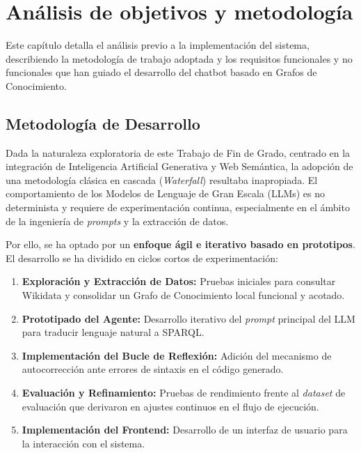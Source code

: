
\chapter{Análisis de objetivos y metodología}
\label{cap:analisis}

Este capítulo detalla el análisis previo a la implementación del sistema, describiendo la metodología de trabajo adoptada y los requisitos funcionales y no funcionales que han guiado el desarrollo del chatbot basado en Grafos de Conocimiento.

\section{Metodología de Desarrollo}

Dada la naturaleza exploratoria de este Trabajo de Fin de Grado, centrado en la integración de Inteligencia Artificial Generativa y Web Semántica, la adopción de una metodología clásica en cascada (\textit{Waterfall}) resultaba inapropiada. El comportamiento de los Modelos de Lenguaje de Gran Escala (LLMs) es no determinista y requiere de experimentación continua, especialmente en el ámbito de la ingeniería de \textit{prompts} y la extracción de datos.

Por ello, se ha optado por un \textbf{enfoque ágil e iterativo basado en prototipos}. El desarrollo se ha dividido en ciclos cortos de experimentación:
\begin{enumerate}
    \item \textbf{Exploración y Extracción de Datos:} Pruebas iniciales para consultar Wikidata y consolidar un Grafo de Conocimiento local funcional y acotado.
    \item \textbf{Prototipado del Agente:} Desarrollo iterativo del \textit{prompt} principal del LLM para traducir lenguaje natural a SPARQL.
    \item \textbf{Implementación del Bucle de Reflexión:} Adición del mecanismo de autocorrección ante errores de sintaxis en el código generado.
    \item \textbf{Evaluación y Refinamiento:} Pruebas de rendimiento frente al \textit{dataset} de evaluación que derivaron en ajustes continuos en el flujo de ejecución.
    \item \textbf{Implementación del Frontend:} Desarrollo de un interfaz de usuario para la interacción con el sistema.
\end{enumerate}

